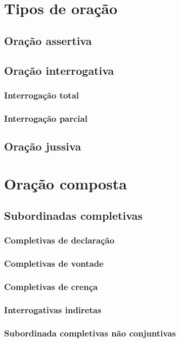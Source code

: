 \section{Tipos de oração}
\lipsum[25]
\subsection{Oração assertiva}
\lipsum[26]
\subsection{Oração interrogativa}
\lipsum[27]
\subsubsection{Interrogação total}
\lipsum[28]
\subsubsection{Interrogação parcial}
\lipsum[29]
\subsection{Oração jussiva}
\lipsum[30]

\section{Oração composta}
\lipsum[31]
\subsection{Subordinadas completivas}
\lipsum[32]
\subsubsection{Completivas de declaração}
\lipsum[33]
\subsubsection{Completivas de vontade}
\lipsum[34]
\subsubsection{Completivas de crença}
\lipsum[35]
\subsubsection{Interrogativas indiretas}
\lipsum[36]
\subsubsection{Subordinada completivas não conjuntivas}
\lipsum[37]
